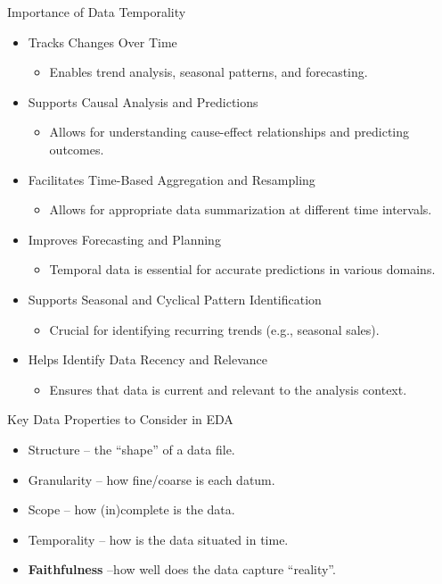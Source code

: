 \documentclass[aspectratio=169]{../latex_main/tntbeamer}  %
\begin{document}
\begin{frame}{Importance of Data Temporality}

\begin{itemize}
    \item {Tracks Changes Over Time}
    \begin{itemize}
        \item Enables trend analysis, seasonal patterns, and forecasting.
    \end{itemize}
\pause
    \item {Supports Causal Analysis and Predictions}
    \begin{itemize}
        \item Allows for understanding cause-effect relationships and predicting outcomes.
    \end{itemize}
\pause
    \item {Facilitates Time-Based Aggregation and Resampling}
    \begin{itemize}
        \item Allows for appropriate data summarization at different time intervals.
    \end{itemize}
\pause
    \item {Improves Forecasting and Planning}
    \begin{itemize}
        \item Temporal data is essential for accurate predictions in various domains.
    \end{itemize}
\pause
    \item {Supports Seasonal and Cyclical Pattern Identification}
    \begin{itemize}
        \item Crucial for identifying recurring trends (e.g., seasonal sales).
    \end{itemize}
\pause
    \item {Helps Identify Data Recency and Relevance}
    \begin{itemize}
        \item Ensures that data is current and relevant to the analysis context.
    \end{itemize}
\end{itemize}

\end{frame}

\begin{frame}[c]{Key Data Properties to Consider in EDA}
    \begin{itemize}
        \item {Structure} -- the “shape” of a data file.
        \item {Granularity} -- how fine/coarse is each datum.
        \item {Scope} -- how (in)complete is the data.
        \item {Temporality} -- how is the data situated in time.
        \item \textbf{Faithfulness} --how well does the data capture “reality”.
    \end{itemize}
\end{frame}
\end{document}
